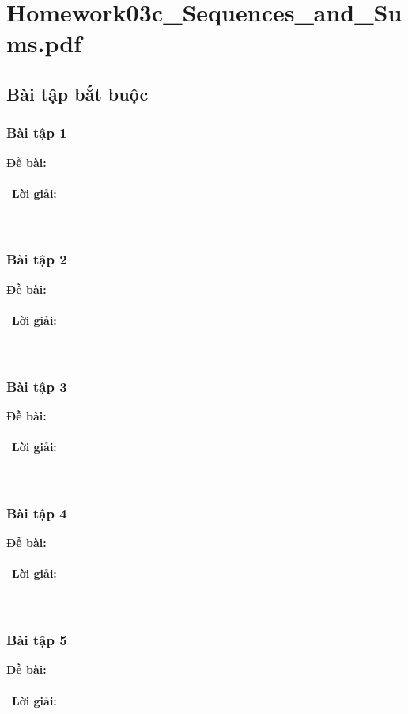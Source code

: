\documentclass[a4paper]{article}
\begin{document}
\section{Homework03c\_Sequences\_and\_Sums.pdf}
\subsection{Bài tập bắt buộc}
\subsubsection{Bài tập 1}
\textbf{Đề bài:} 
\\\ \\\
\textbf{Lời giải:} \\\ \\\
\clearpage
\subsubsection{Bài tập 2}
\textbf{Đề bài:} 
\\\ \\\
\textbf{Lời giải:} \\\ \\\
\clearpage
\subsubsection{Bài tập 3}
\textbf{Đề bài:} 
\\\ \\\
\textbf{Lời giải:} \\\ \\\
\clearpage
\subsubsection{Bài tập 4}
\textbf{Đề bài:} 
\\\ \\\
\textbf{Lời giải:} \\\ \\\
\clearpage
\subsubsection{Bài tập 5}
\textbf{Đề bài:} 
\\\ \\\
\textbf{Lời giải:} \\\ \\\
\clearpage

\clearpage
\end{document}
